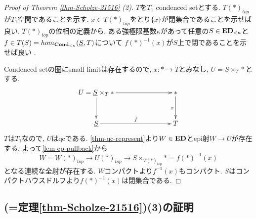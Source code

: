 \documentclass[dvipdfmx,a4paper,11pt]{report}
\theoremstyle{definition}
\begin{document}
\begin{proof}[Proof of Theorem \ref{thm-Scholze-21516} (2)]
$T$を$T_1$ condenced setとする. 
$T(\ast)_{top}$が$T_1$空間であることを示す.
$x \in T(\ast)_{top}$をとり$\{ x\}$が閉集合であることを示せば良い. 
$T(\ast)_{top}$の位相の定義から, ある強極限基数$\kappa$があって任意の$S \in {\bf ED}_{< \kappa}$と$f \in T(S) = hom_{{\bf Cond}_{< \kappa}}(\underline{S}, T)$について
$f(\ast)^{-1}(x)$が$S$上で閉であることを示せば良い .

Condenced setの圏にsmall limitは存在するので, $x : \ast \to T$とみなし, $U = \underline{S} \times_{T} \ast $とする. 
\begin{equation*}
\xymatrix@C=80pt@R=30pt{
U = \underline{S} \times_{T} \ast \ar@{->}[r]
\ar@{->}[d]
& \ast \ar@{->}[d]_{x}
\\
\underline{S} \ar@{->}[r]^{f}
&T
 \\   
}
\end{equation*}
$T$は$T_1$なので, $U$はqcである.
\ref{thm-qc-represent}より$W \in {\bf ED}$とepi射$\underline{W} \to U$が存在する.
よって\ref{lem-ep-pullback}から
$$
W=\underline{W}(\ast)_{top} \to U(\ast)_{top}
\to S \times_{T(\ast)_{top}} \ast = f(\ast)^{-1}(x)
$$
となる連続な全射が存在する. 
$W$コンパクトより$f^{-1}(x)$もコンパクト. $S$はコンパクトハウスドルフより$f(\ast)^{-1}(x)$は閉集合である. 
\end{proof}

\subsection{\cite[Proposition 2.15, Theorem 2.16]{Sch19}(=定理\ref{thm-Scholze-21516})(3)の証明}
\end{document}
